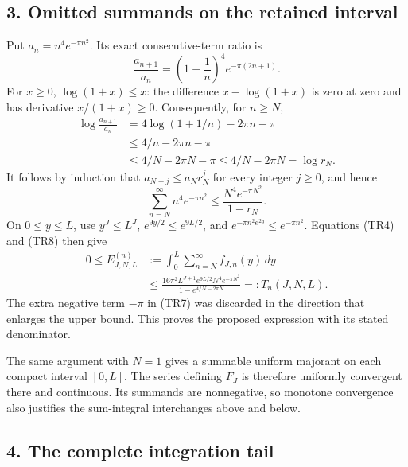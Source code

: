\subsection{3. Omitted summands on the retained interval}\label{omitted-summands-on-the-retained-interval}

Put \(a_n=n^4e^{-\pi n^2}\). Its exact consecutive-term ratio is \[
 \frac{a_{n+1}}{a_n}
 =\left(1+\frac1n\right)^4e^{-\pi(2n+1)}.
 \tag{TR6}
\] For \(x\geq0\), \(\log(1+x)\leq x\): the difference \(x-\log(1+x)\) is zero at zero and has derivative \(x/(1+x)\geq0\). Consequently, for \(n\geq N\), \[
 \begin{aligned}
 \log\frac{a_{n+1}}{a_n}
 &=4\log(1+1/n)-2\pi n-\pi\\
 &\leq4/n-2\pi n-\pi\\
 &\leq4/N-2\pi N-\pi
 \leq4/N-2\pi N=\log r_N.
 \end{aligned}
 \tag{TR7}
\] It follows by induction that \(a_{N+j}\leq a_Nr_N^j\) for every integer \(j\geq0\), and hence \[
 \sum_{n=N}^{\infty}n^4e^{-\pi n^2}
 \leq \frac{N^4e^{-\pi N^2}}{1-r_N}.
 \tag{TR8}
\] On \(0\leq y\leq L\), use \(y^J\leq L^J\), \(e^{9y/2}\leq e^{9L/2}\), and \(e^{-\pi n^2e^{2y}}\leq e^{-\pi n^2}\). Equations (TR4) and (TR8) then give \[
 \begin{aligned}
 0\leq E_{J,N,L}^{(n)}
 &:=\int_0^L\sum_{n=N}^{\infty}f_{J,n}(y)\,dy\\
 &\leq
 \frac{16\pi^2L^{J+1}e^{9L/2}N^4e^{-\pi N^2}}
 {1-e^{4/N-2\pi N}}
 =:T_n(J,N,L).
 \end{aligned}
 \tag{TR9}
\] The extra negative term \(-\pi\) in (TR7) was discarded in the direction that enlarges the upper bound. This proves the proposed expression with its stated denominator.

The same argument with \(N=1\) gives a summable uniform majorant on each compact interval \([0,L]\). The series defining \(F_J\) is therefore uniformly convergent there and continuous. Its summands are nonnegative, so monotone convergence also justifies the sum-integral interchanges above and below.

\subsection{4. The complete integration tail}\label{the-complete-integration-tail}

